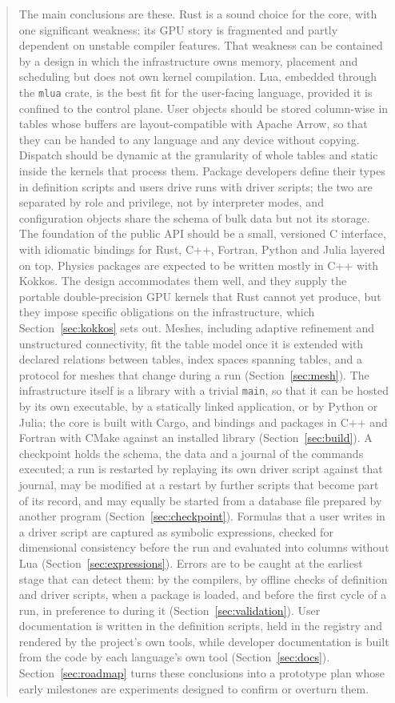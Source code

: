 \documentclass[11pt,a4paper]{article}
\newcommand{\code}[1]{\texttt{#1}}
\begin{document}
\begin{abstract}
The main conclusions are these.  Rust is a sound choice for the core, with one
significant weakness: its GPU story is fragmented and partly dependent on
unstable compiler features.  That weakness can be contained by a design in
which the infrastructure owns memory, placement and scheduling but does not
own kernel compilation.  Lua, embedded through the \code{mlua} crate, is the
best fit for the user-facing language, provided it is confined to the control
plane.  User objects should be stored column-wise in tables whose buffers are
layout-compatible with Apache Arrow, so that they can be handed to any
language and any device without copying.  Dispatch should be dynamic at the
granularity of whole tables and static inside the kernels that process them.
Package developers define their types in definition scripts and users drive
runs with driver scripts; the two are separated by role and privilege, not by
interpreter modes, and configuration objects share the schema of bulk data
but not its storage.
The foundation of the public API should be a small, versioned C interface,
with idiomatic bindings for Rust, C++, Fortran, Python and Julia layered on
top.  Physics packages are expected to be written mostly in C++ with Kokkos.
The design accommodates them well, and they supply the portable
double-precision GPU kernels that Rust cannot yet produce, but they impose
specific obligations on the infrastructure, which Section~\ref{sec:kokkos}
sets out.  Meshes, including adaptive refinement and unstructured
connectivity, fit the table model once it is extended with declared relations
between tables, index spaces spanning tables, and a protocol for meshes that
change during a run (Section~\ref{sec:mesh}).  The infrastructure itself is
a library with a trivial \code{main}, so that it can be hosted by its own
executable, by a statically linked application, or by Python or Julia; the
core is built with Cargo, and bindings and packages in C++ and Fortran with
CMake against an installed library (Section~\ref{sec:build}).
A checkpoint holds the schema, the data and a journal of the commands
executed; a run is restarted by replaying its own driver script against that
journal, may be modified at a restart by further scripts that become part of
its record, and may equally be started from a database file prepared by
another program (Section~\ref{sec:checkpoint}).
Formulas that a user writes in a driver script are captured as symbolic
expressions, checked for dimensional consistency before the run and
evaluated into columns without Lua (Section~\ref{sec:expressions}).
Errors are to be caught at the earliest stage that can detect them: by the
compilers, by offline checks of definition and driver scripts, when a package
is loaded, and before the first cycle of a run, in preference to during it
(Section~\ref{sec:validation}).
User documentation is written in the definition scripts, held in the registry
and rendered by the project's own tools, while developer documentation is
built from the code by each language's own tool (Section~\ref{sec:docs}).
Section~\ref{sec:roadmap} turns these conclusions into a prototype plan whose
early milestones are experiments designed to confirm or overturn them.
\end{abstract}
\end{document}
